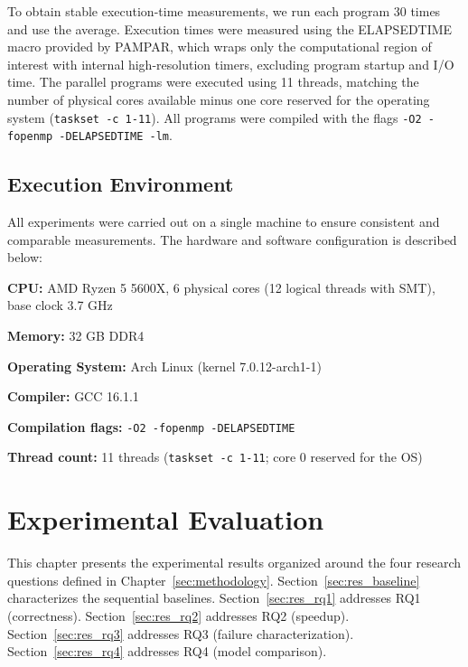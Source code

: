 \documentclass[conference]{IEEEtran}
\begin{document}
To obtain stable execution-time measurements, we run each program 30 times and use the average.
Execution times were measured using the ELAPSEDTIME macro provided by PAMPAR, which wraps only the computational region of interest with internal high-resolution timers, excluding program startup and I/O time.
The parallel programs were executed using 11 threads, matching the number of physical cores available minus one core reserved for the operating system (\texttt{taskset -c 1-11}).
All programs were compiled with the flags \texttt{-O2 -fopenmp -DELAPSEDTIME -lm}.

\subsection{Execution Environment} \label{sec:environment}

All experiments were carried out on a single machine to ensure consistent and comparable measurements.
The hardware and software configuration is described below:

\textbf{CPU:} AMD Ryzen 5 5600X, 6 physical cores (12 logical threads with SMT), base clock 3.7 GHz

\textbf{Memory:} 32 GB DDR4

\textbf{Operating System:} Arch Linux (kernel 7.0.12-arch1-1)

\textbf{Compiler:} GCC 16.1.1

\textbf{Compilation flags:} \texttt{-O2 -fopenmp -DELAPSEDTIME} %

\textbf{Thread count:} 11 threads (\texttt{taskset -c 1-11}; core 0 reserved for the OS)
 
\section{Experimental Evaluation} \label{sec:resultado}

This chapter presents the experimental results organized around the four research questions defined in Chapter~\ref{sec:methodology}. Section~\ref{sec:res_baseline} characterizes the sequential baselines. Section~\ref{sec:res_rq1} addresses RQ1 (correctness). Section~\ref{sec:res_rq2} addresses RQ2 (speedup). Section~\ref{sec:res_rq3} addresses RQ3 (failure characterization). Section~\ref{sec:res_rq4} addresses RQ4 (model comparison).
\end{document}
